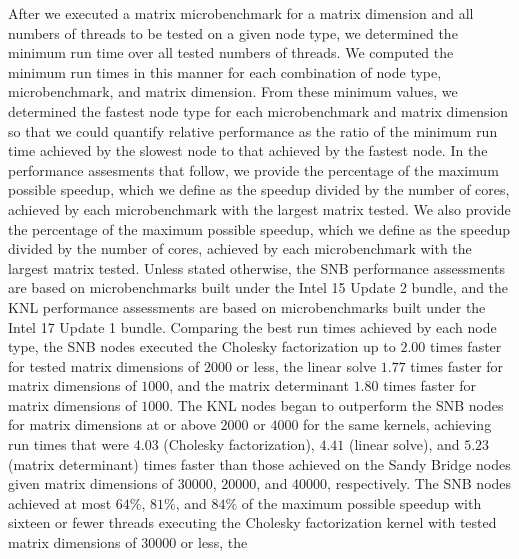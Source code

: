 After we executed a matrix microbenchmark for a matrix dimension and all numbers
  of threads to be tested on a given node type, we determined the minimum run
  time over all tested numbers of threads.
We computed the minimum run times in this manner for each combination of node
  type, microbenchmark, and matrix dimension.
From these minimum values, we determined the fastest node type for each
  microbenchmark and matrix dimension so that we could quantify relative
  performance as the ratio of the minimum run time achieved by the slowest node
  to that achieved by the fastest node.
In the performance assesments that follow, we provide the percentage of the
  maximum possible speedup, which we define as the speedup divided by the number
  of cores, achieved by each microbenchmark with the largest matrix tested.
We also provide the percentage of the maximum possible speedup, which we define
  as the speedup divided by the number of cores, achieved by each microbenchmark
  with the largest matrix tested.
Unless stated otherwise, the SNB performance assessments are based on
  microbenchmarks built under the Intel 15 Update 2 bundle, and the KNL
  performance assessments are based on microbenchmarks built under the Intel 17
  Update 1 bundle.
Comparing the best run times achieved by each node type, the SNB nodes
  executed the Cholesky factorization up to $2.00$ times faster for tested
  matrix dimensions of $2000$ or less, the linear solve $1.77$ times
  faster for matrix dimensions of $1000$, and the matrix determinant $1.80$
  times faster for matrix dimensions of $1000$.
The KNL nodes began to outperform the SNB nodes for matrix
  dimensions at or above $2000$ or $4000$ for the same kernels, achieving run
  times that were $4.03$ (Cholesky factorization), $4.41$ (linear solve),
  and $5.23$ (matrix determinant) times faster than those achieved on the Sandy
  Bridge nodes given matrix dimensions of $30000$, $20000$, and $40000$,
  respectively.
The SNB nodes achieved at most $64\%$, $81\%$, and $84\%$ of the
  maximum possible speedup with sixteen or fewer threads executing the Cholesky
  factorization kernel with tested matrix dimensions of $30000$ or less, the
